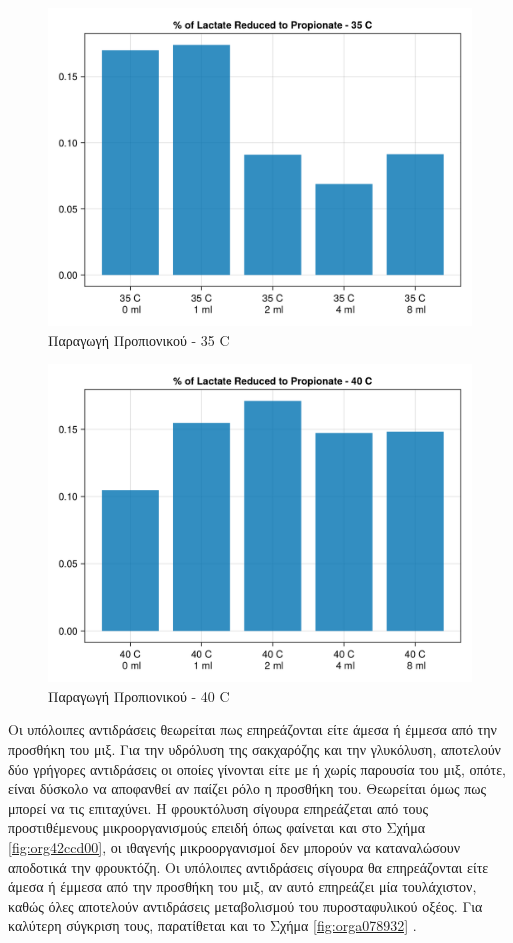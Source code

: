 \documentclass[11pt]{report}
\begin{document}
\begin{figure}[htbp]
\centering
\includegraphics[width=.9\linewidth]{../plots/metabolic_results/propionate_flux_35.png}
\caption{\label{fig:orgbed8736}Παραγωγή Προπιονικού - 35 C}
\end{figure}

\begin{figure}[htbp]
\centering
\includegraphics[width=.9\linewidth]{../plots/metabolic_results/propionate_flux_40.png}
\caption{\label{fig:org911e397}Παραγωγή Προπιονικού - 40 C}
\end{figure}

Οι υπόλοιπες αντιδράσεις θεωρείται πως επηρεάζονται είτε άμεσα ή έμμεσα από την προσθήκη του μιξ. Για την υδρόλυση της σακχαρόζης και την γλυκόλυση, αποτελούν δύο γρήγορες αντιδράσεις οι οποίες γίνονται είτε με ή χωρίς παρουσία του μιξ, οπότε, είναι δύσκολο να αποφανθεί αν παίζει ρόλο η προσθήκη του. Θεωρείται όμως πως μπορεί να τις επιταχύνει. Η φρουκτόλυση σίγουρα επηρεάζεται από τους προστιθέμενους μικροοργανισμούς επειδή όπως φαίνεται και στο Σχήμα \ref{fig:org42ccd00}, οι ιθαγενής μικροοργανισμοί δεν μπορούν να καταναλώσουν αποδοτικά την φρουκτόζη. Οι υπόλοιπες αντιδράσεις σίγουρα θα επηρεάζονται είτε άμεσα ή έμμεσα από την προσθήκη του μιξ, αν αυτό επηρεάζει μία τουλάχιστον, καθώς όλες αποτελούν αντιδράσεις μεταβολισμού του πυροσταφυλικού οξέος. Για καλύτερη σύγκριση τους, παρατίθεται και το Σχήμα \ref{fig:orga078932} . 
\end{document}
